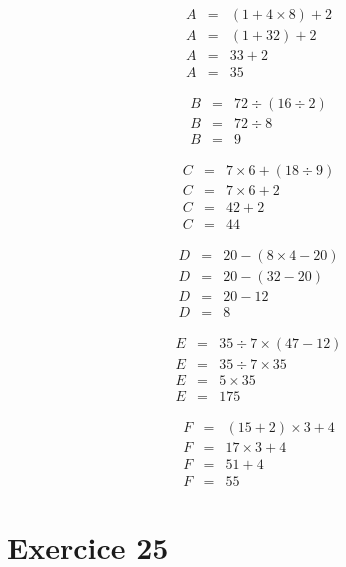 \begin{multicols}{3}
	\begin{eqnarray*}
		A &=&  (1 + 4 \times 8) + 2 \\
		A &=& (1 + 32) + 2 \\
		A &=& 33 + 2 \\
		A &=& 35
	\end{eqnarray*}
	
	\begin{eqnarray*}
		B &=& 72 \div (16 \div 2) \\
		B &=& 72 \div 8 \\
		B &=& 9 
	\end{eqnarray*}
	
	\begin{eqnarray*}
		C &=& 7 \times 6 + (18 \div 9) \\
		C &=& 7 \times 6 + 2 \\
		C &=& 42 + 2 \\
		C &=& 44
	\end{eqnarray*}
	
	\begin{eqnarray*}
		D &=&  20 - (8 \times 4 - 20) \\
		D &=& 20 - (32 - 20) \\
		D &=& 20 - 12 \\
		D &=& 8
	\end{eqnarray*}
	
	\begin{eqnarray*}
		E &=& 35 \div 7 \times (47 - 12) \\
		E &=& 35 \div 7 \times 35 \\
		E &=& 5 \times 35 \\
		E &=& 175
	\end{eqnarray*}
	
	\begin{eqnarray*}
		F &=&  (15 + 2) \times 3 + 4 \\
		F &=& 17 \times 3 + 4 \\
		F &=& 51 + 4 \\
		F &=& 55
	\end{eqnarray*}
\end{multicols}

\newpage

\section*{Exercice 25}
\vspace*{-1cm}

